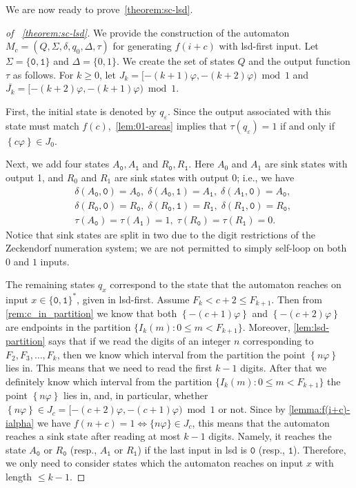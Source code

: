 \documentclass[12pt,runningheads]{llncs}
\newcommand{\tO}{\mathtt{0}}
\newcommand{\tL}{\mathtt{1}}
\renewcommand{\phi}{\varphi}
\newcommand{\fract}[1]{\left\{ #1 \right\}}
\begin{document}
We are now ready to prove~\cref{theorem:sc-lsd}. 
\begin{proof}[of ~\cref{theorem:sc-lsd}]
We provide the construction of the automaton $M_c=(Q,  \Sigma, \delta, q_0, \Delta, \tau)$ for generating $f(i+c)$ with lsd-first input. Let $\Sigma=\{\tO,\tL\}$ and $\Delta = \{0,1\}$. 
We create the set of states $Q$ and the output function $\tau$ as follows. For $k\geq 0$, let $J_k=[-(k+1)\phi,-(k+2)\phi)\bmod 1$ and $\overline{J_k}=[-(k+2)\phi,-(k+1)\phi)\bmod 1$.
    
First, the initial state is denoted by $q_\varepsilon$.  Since the output associated with this state must match $f(c)$,~\cref{lem:01-areas} implies that $\tau(q_\varepsilon)=1$ if and only if $\fract{c\phi}\in J_0$.

Next, we add four states $A_{\tO},A_{\tL}$ and $R_{\tO},R_{\tL}$. Here $A_0$ and $A_1$ are sink states with output 1, and $R_0$ and $R_1$ are sink states with output 0; i.e., we have
\begin{align*}
    &\delta(A_{\tO},\tO)=A_{\tO}, \; \delta(A_{\tO},\tL)=A_{\tL}, \; \delta(A_{\tL},\tO)=A_{\tO}, \\ &\delta(R_{\tO},\tO)=R_{\tO}, \; \delta(R_{\tO},\tL)=R_{\tL}, \; \delta(R_{\tL},\tO)=R_{\tO}, \\
    &\tau(A_{\tO})=\tau(A_{\tL})=1, \; \tau(R_{\tO})=\tau(R_{\tL})=0. 
\end{align*} 
Notice that sink states are split in two due to the digit restrictions of the Zeckendorf numeration system; we are not permitted to simply self-loop on both $0$ and $1$ inputs.

The remaining states $q_x$ correspond to the state that the automaton reaches on input $x\in \{\tO,\tL\}^*$, given in lsd-first. 
Assume $F_{k}<c+2 \leq F_{k+1}$.  
Then from \cref{rem:c_in_partition} we know that both $\fract{-(c+1)\phi}$ and $\fract{-(c+2)\phi}$ are endpoints in the partition $\{I_k(m) \colon 0\leq m<F_{k+1}\}$.
Moreover, \cref{lem:lsd-partition} says that if we read the digits of an integer $n$ corresponding to $F_2, F_3, \ldots, F_k$, then we know which interval from the partition the point $\fract{n\phi}$ lies in. 
This means that we need to read the first $k-1$ digits.
After that we definitely know which interval from the partition $\{I_k(m) \colon 0\leq m<F_{k+1}\}$ the point $\fract{n\phi}$ lies in, and, in particular, whether $\fract{n\phi} \in J_c = [-(c+2)\phi,-(c+1)\phi)\bmod 1$ or not. 
Since by \cref{lemma:f(i+c)-ialpha} we have $f(n+c)=1 \iff \{n\phi\} \in J_c$, this means that the automaton reaches a sink state after reading at most $k-1$ digits. Namely, it reaches the state $A_{\tO}$ or $R_{\tO}$ (resp., $A_{\tL}$ or $R_{\tL}$) if the last input in lsd is $\tO$ (resp., $\tL$). 
Therefore, we only need to consider states which the automaton reaches on input $x$ with length $\leq k-1$.


\end{proof}
\end{document}
